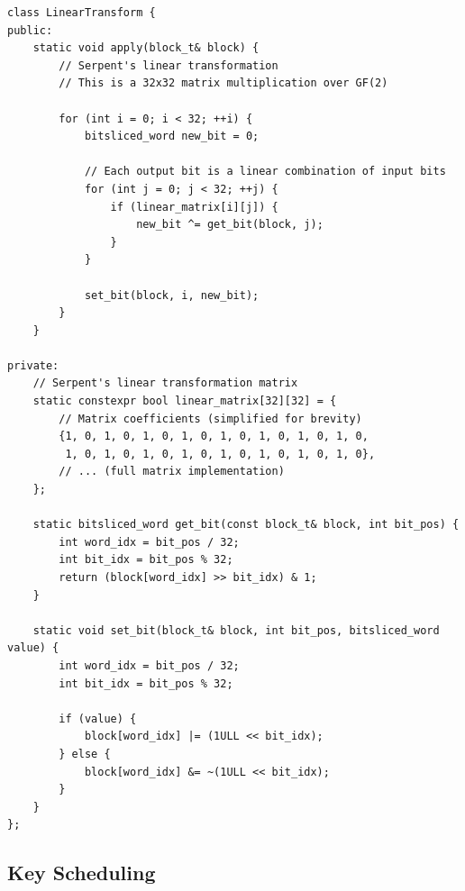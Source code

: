 \documentclass[12pt,a4paper]{article}
\begin{document}
\begin{lstlisting}[caption=Linear Transformation Implementation]
class LinearTransform {
public:
    static void apply(block_t& block) {
        // Serpent's linear transformation
        // This is a 32x32 matrix multiplication over GF(2)
        
        for (int i = 0; i < 32; ++i) {
            bitsliced_word new_bit = 0;
            
            // Each output bit is a linear combination of input bits
            for (int j = 0; j < 32; ++j) {
                if (linear_matrix[i][j]) {
                    new_bit ^= get_bit(block, j);
                }
            }
            
            set_bit(block, i, new_bit);
        }
    }

private:
    // Serpent's linear transformation matrix
    static constexpr bool linear_matrix[32][32] = {
        // Matrix coefficients (simplified for brevity)
        {1, 0, 1, 0, 1, 0, 1, 0, 1, 0, 1, 0, 1, 0, 1, 0,
         1, 0, 1, 0, 1, 0, 1, 0, 1, 0, 1, 0, 1, 0, 1, 0},
        // ... (full matrix implementation)
    };

    static bitsliced_word get_bit(const block_t& block, int bit_pos) {
        int word_idx = bit_pos / 32;
        int bit_idx = bit_pos % 32;
        return (block[word_idx] >> bit_idx) & 1;
    }

    static void set_bit(block_t& block, int bit_pos, bitsliced_word value) {
        int word_idx = bit_pos / 32;
        int bit_idx = bit_pos % 32;
        
        if (value) {
            block[word_idx] |= (1ULL << bit_idx);
        } else {
            block[word_idx] &= ~(1ULL << bit_idx);
        }
    }
};
\end{lstlisting}

\subsection{Key Scheduling}
\end{document}
